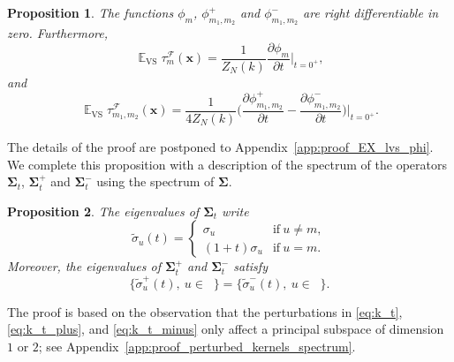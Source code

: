 \documentclass[twoside,11pt]{book}
\newtheorem{proposition}{Proposition}
\numberwithin{theorem}{chapter}
\numberwithin{definition}{chapter}
\numberwithin{proposition}{chapter}
\numberwithin{corollary}{chapter}
\numberwithin{example}{chapter}
\numberwithin{lemma}{chapter}
\DeclareMathOperator{\VS}{\mathrm{VS}}
\DeclareMathOperator{\EX}{\mathbb{E}}
\DeclareMathOperator{\F}{\mathcal{F}}
\DeclareMathOperator{\Ns}{\mathbb{N}^{*}}
\begin{document}
\begin{proposition}\label{thm:EX_lvs_phi}
The functions $\phi_m$, $\phi_{m_1,m_2}^{+}$ and $\phi_{m_1,m_2}^{-}$ are right differentiable in zero. Furthermore,
\begin{equation}\label{eq:EX_lvs_n_delta_phi_n}
\EX_{\VS} \tau_{m}^{\F}(\bm{x})  = \frac{1}{Z_{N}(k)}  \frac{\partial \phi_{m}}{ \partial t }\bigg|_{t = 0^{+}},
\end{equation}
and
\begin{equation}\label{eq:EX_VS_cross_lvs_formula}
\EX_{\VS} \tau_{m_{1},m_{2}}^{\F}(\bm{x}) = \frac{1}{4Z_{N}(k)} \bigg(\frac{\partial \phi_{m_{1},m_{2}}^{+}}{ \partial t } - \frac{\partial \phi_{m_{1},m_{2}}^{-}}{ \partial t }\bigg)\bigg|_{t = 0^{+}}.
\end{equation}
\end{proposition}
 The details of the proof are postponed to Appendix~\ref{app:proof_EX_lvs_phi}. We complete this proposition with a description of the spectrum of the operators $\bm{\Sigma}_{t}$, $\bm{\Sigma}_{t}^{+}$ and $\bm{\Sigma}_{t}^{-}$ using the spectrum of $\bm{\Sigma}$.
\begin{proposition}\label{prop:perturbed_kernels_spectrum}
The eigenvalues of $\bm{\Sigma}_{t}$ write
\begin{equation}
\tilde{\sigma}_{u}(t) =  \left\{
    \begin{array}{ll}
        \sigma_{u} & \mbox{if} \: u \neq m, \\
        (1 + t)\sigma_{u} & \mbox{if}\: u = m.
    \end{array}
\right.
\end{equation}
Moreover, the eigenvalues of $\bm{\Sigma}_{t}^{+}$ and $\bm{\Sigma}_{t}^{-}$ satisfy
\begin{equation}\label{eq:equality_positive_negative_spectrum}
\{\tilde{\sigma}_{u}^{+}(t), \: u \in \Ns \} = \{\tilde{\sigma}_{u}^{-}(t), \: u \in \Ns \}.
\end{equation}
\end{proposition}
The proof is based on the observation that the perturbations in \eqref{eq:k_t}, \eqref{eq:k_t_plus}, and \eqref{eq:k_t_minus} only affect a principal subspace of dimension $1$ or $2$; see Appendix~\ref{app:proof_perturbed_kernels_spectrum}.
\end{document}
